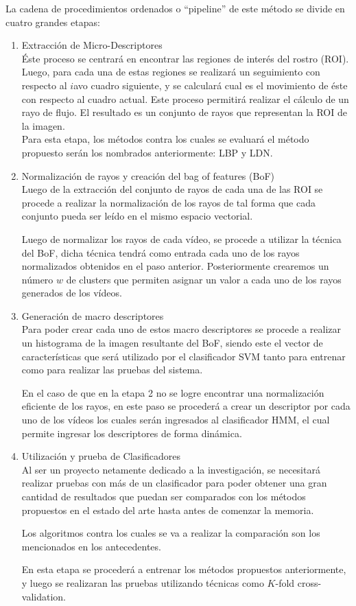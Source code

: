 \documentclass{article}
\begin{document}
La cadena de procedimientos ordenados o ``pipeline'' de este método se divide en cuatro grandes etapas:
    \begin{enumerate}
    \item Extracción de Micro-Descriptores\\
    Éste proceso se centrará en encontrar las regiones de interés del rostro (ROI). Luego, para cada una de estas regiones se realizará un seguimiento con respecto al $i$avo cuadro siguiente, y se calculará cual es el movimiento de éste con respecto al cuadro actual. Este proceso permitirá realizar el cálculo de un rayo de flujo. El resultado es un conjunto de rayos que representan la ROI de la imagen.\\
    Para esta etapa, los métodos contra los cuales se evaluará el método propuesto serán los nombrados anteriormente: LBP y LDN.
    \item Normalización de rayos y creación del bag of features (BoF)\\
Luego de la extracción del conjunto de rayos de cada una de las ROI se procede a realizar la normalización de los rayos de tal forma que cada conjunto pueda ser leído en el mismo espacio vectorial.

Luego de normalizar los rayos de cada vídeo, se procede a utilizar la técnica del BoF, dicha técnica tendrá como entrada cada uno de los rayos normalizados obtenidos en el paso anterior. Posteriormente crearemos un número $w$ de clusters que permiten asignar un valor a cada uno de los rayos generados de los vídeos. 

    \item Generación de macro descriptores\\
Para poder crear cada uno de estos macro descriptores se procede a realizar un histograma de la imagen resultante del BoF, siendo este el vector de características que será utilizado por el clasificador SVM tanto para entrenar como para realizar las pruebas del sistema.

En el caso de que en la etapa 2 no se logre encontrar una normalización eficiente de los rayos, en este paso se procederá a crear un descriptor por cada uno de los vídeos los cuales serán ingresados al clasificador HMM, el cual permite ingresar los descriptores de forma dinámica.
	
    \item Utilización y prueba de Clasificadores\\
Al ser un proyecto netamente dedicado a la investigación, se necesitará realizar pruebas con más de un clasificador para poder obtener una gran cantidad de resultados que puedan ser comparados con los métodos propuestos en el estado del arte hasta antes de comenzar la memoria. 

Los algoritmos contra los cuales se va a realizar la comparación son los mencionados en los antecedentes.

En esta etapa se procederá a entrenar los métodos propuestos anteriormente, y luego se realizaran las pruebas utilizando técnicas como $K$-fold cross-validation.
    \end{enumerate}
    
\end{document}
